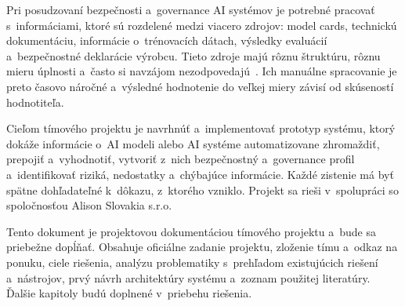 Pri posudzovaní bezpečnosti a~governance AI systémov je potrebné pracovať
s~informáciami, ktoré sú rozdelené medzi viacero zdrojov: model cards,
technickú dokumentáciu, informácie o~trénovacích dátach, výsledky evaluácií
a~bezpečnostné deklarácie výrobcu. Tieto zdroje majú rôznu štruktúru, rôznu
mieru úplnosti a~často si navzájom nezodpovedajú~\cite{mitchell2019,liang2024}.
Ich manuálne spracovanie je preto časovo náročné a~výsledné hodnotenie do veľkej
miery závisí od skúseností hodnotiteľa.

Cieľom tímového projektu je navrhnúť a~implementovať prototyp systému, ktorý
dokáže informácie o~AI modeli alebo AI systéme automatizovane zhromaždiť,
prepojiť a~vyhodnotiť, vytvoriť z~nich bezpečnostný a~governance profil
a~identifikovať riziká, nedostatky a~chýbajúce informácie. Každé zistenie má
byť spätne dohľadateľné k~dôkazu, z~ktorého vzniklo. Projekt sa rieši
v~spolupráci so spoločnosťou Alison Slovakia s.r.o.

Tento dokument je projektovou dokumentáciou tímového projektu a~bude sa
priebežne dopĺňať. Obsahuje oficiálne zadanie projektu, zloženie tímu
a~odkaz na ponuku, ciele riešenia, analýzu problematiky s~prehľadom
existujúcich riešení a~nástrojov, prvý návrh architektúry systému
a~zoznam použitej literatúry. Ďalšie kapitoly budú doplnené v~priebehu
riešenia.
